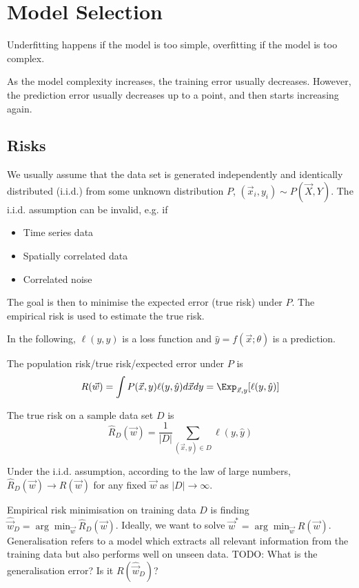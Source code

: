 \section{Model Selection}
Underfitting happens if the model is too
simple, overfitting if the model is too complex.

As the model complexity increases,
the training error usually decreases.
However, the prediction error usually
decreases up to a point, and then starts
increasing again.


\subsection{Risks}
We usually assume that the data set is generated
independently and identically distributed (i.i.d.)
from some unknown distribution $P$,
$(\vec{x}_i, y_i) \sim P(\vec{X}, Y)$.
The i.i.d. assumption can be invalid, e.g. if
\begin{itemize}
    \item Time series data
    \item Spatially correlated data
    \item Correlated noise
\end{itemize}
The goal is then to minimise the expected error
(true risk) under $P$.
The empirical risk is used to estimate the true risk.

In the following, $\ell(y, \hat{y})$ is a loss function
and $\hat{y} = f(\vec{x}; \theta)$ is a prediction.

The population risk/true risk/expected error under $P$ is
\begin{equation*}
    R(\vec{w})
    = \int{P(\vec{x}, y)\ell(y, \hat{y}) d\vec{x} dy}
    = \Exp_{\vec{x}, y}[\ell(y, \hat{y})]
\end{equation*}

The true risk on a sample data set $D$ is
\begin{equation*}
    \hat{R}_D(\vec{w}) = \frac{1}{|D|}
        \sum_{(\vec{x}, y) \in D}{\ell(y, \hat{y})}
\end{equation*}

Under the i.i.d. assumption,
according to the law of large numbers,
$\hat{R}_D(\vec{w}) \to R(\vec{w})$
for any fixed $\vec{w}$ as $|D| \to \infty$.

Empirical risk minimisation on training data $D$ is
finding
$\hat{\vec{w}}_D = \arg\min_{\vec{w}}{\hat{R}_D(\vec{w})}$.
Ideally, we want to solve
$\vec{w}^* = \arg\min_{\vec{w}}{R(\vec{w})}$.
Generalisation refers to a model which extracts
all relevant information from the training data
but also performs well on unseen data.
TODO: What is the generalisation error? Is it $R(\hat{\vec{w}}_D)$?

